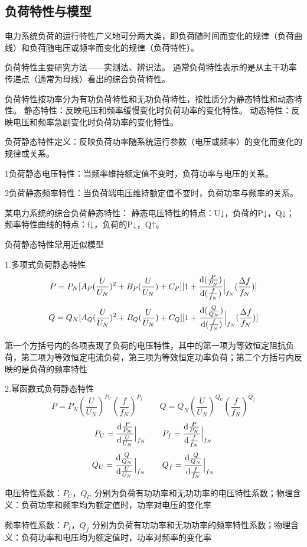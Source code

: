 \documentclass[UTF8, 12pt, a4paper]{ctexart}
\begin{document}
\subsection{负荷特性与模型}
电力系统负荷的运行特性广义地可分两大类，即负荷随时间而变化的规律（负荷曲线）和负荷随电压或频率而变化的规律（负荷特性）。

负荷特性主要研究方法——实测法、辨识法。
通常负荷特性表示的是从主干功率传递点（通常为母线）看出的综合负荷特性。

负荷特性按功率分为有功负荷特性和无功负荷特性，按性质分为静态特性和动态特性。
静态特性：反映电压和频率缓慢变化时负荷功率的变化特性。
动态特性：反映电压和频率急剧变化时负荷功率的变化特性。

负荷静态特性定义：反映负荷功率随系统运行参数（电压或频率）的变化而变化的规律或关系。

1负荷静态电压特性：当频率维持额定值不变时，负荷功率与电压的关系。

2负荷静态频率特性：当负荷端电压维持额定值不变时，负荷功率与频率的关系。

某电力系统的综合负荷静态特性：
静态电压特性的特点：U↓，负荷的P↓，Q↓；
频率特性曲线的特点：f↓，负荷的P↓，Q↑。

负荷静态特性常用近似模型

1.多项式负荷静态特性
\[P=P_N[A_P(\frac{U}{U_N})^2+B_P(\frac{U}{U_N})+C_P][1+\frac{\mathrm{d}(\frac{P}{P_N})}{\mathrm{d}(\frac{f}{f_N})}\Bigl{|}_{f_N}(\frac{\Delta f}{f_N})]\]
\[Q=Q_N[A_Q(\frac{U}{U_N})^2+B_Q(\frac{U}{U_N})+C_Q][1+\frac{\mathrm{d}(\frac{Q}{Q_N})}{\mathrm{d}(\frac{f}{f_N})}\Bigl{|}_{f_N}(\frac{\Delta f}{f_N})]\]

第一个方括号内的各项表现了负荷的电压特性，其中的第一项为等效恒定阻抗负荷，第二项为等效恒定电流负荷，第三项为等效恒定功率负荷；第二个方括号内反映的是负荷的频率特性

2.幂函数式负荷静态特性
\[P=P_N(\frac{U}{U_N})^{P_U}(\frac{f}{f_N})^{P_f} \qquad Q=Q_N(\frac{U}{U_N})^{Q_U}(\frac{f}{f_N})^{Q_f}\]
\[
    P_U = \frac{\mathrm{d}{\frac{P}{P_N}}}{\mathrm{d}{\frac{U}{U_N}}}\Bigl{|}_{f_N}\qquad
    P_f = \frac{\mathrm{d}{\frac{P}{P_N}}}{\mathrm{d}{\frac{f}{f_N}}}\Bigl{|}_{f_N}
\]
\[
    Q_U = \frac{\mathrm{d}{\frac{Q}{Q_N}}}{\mathrm{d}{\frac{U}{U_N}}}\Bigl{|}_{f_N}\qquad
    Q_f = \frac{\mathrm{d}{\frac{Q}{Q_N}}}{\mathrm{d}{\frac{f}{f_N}}}\Bigl{|}_{f_N}
\]

电压特性系数：$P_U$，$Q_U$ 分别为负荷有功功率和无功功率的电压特性系数；物理含义：负荷功率和频率均为额定值时，功率对电压的变化率

频率特性系数：$P_f$，$Q_f$ 分别为负荷有功功率和无功功率的频率特性系数；物理含义：负荷功率和电压均为额定值时，功率对频率的变化率
\end{document}
